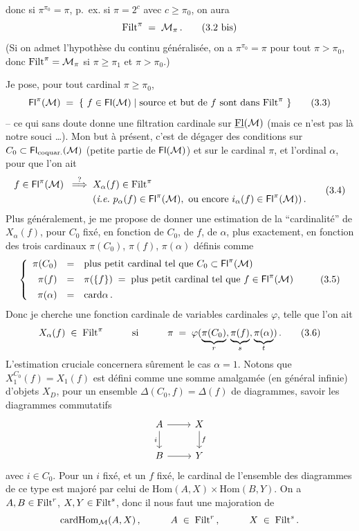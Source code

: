 donc si $\pi^{\pi_0}=\pi$, p.~ex. si $\pi=2^c$ avec $c\geq\pi_0$, on aura
\[
\Filt^\pi \;=\; \cM_\pi\,.
\tag*{(3.2 bis)}
\]
(Si on admet l'hypothèse du continu généralisée, on a $\pi^{\pi_0}=\pi$ pour tout $\pi>\pi_0$, donc $\mathrm{Filt}^\pi=\mathcal{M}_\pi$ si $\pi\geq\pi_1$ et $\pi>\pi_0$.)

Je pose, pour tout cardinal $\pi\geq\pi_0$,
\[
\Fl^\pi(\cM) \;=\; \{\ f\in\Fl(\cM) \mid \text{source et but de $f$ sont dans } \Filt^\pi\ \}
\tag*{(3.3)}
\]
-- ce qui sans doute donne une filtration cardinale sur $\underline{\mathrm{Fl}}(\mathcal{M})$ (mais ce n'est pas là notre souci \ldots). Mon but à présent, c'est de dégager des conditions sur $C_0\subset\mathsf{Fl}_{\text{coquar.}}(\mathcal{M})$ (petite partie de $\mathsf{Fl}(\mathcal{M})$) et sur le cardinal $\pi$, et l'ordinal $\alpha$, pour que l'on ait
\[
\begin{aligned}
f\in\Fl^\pi(\cM) \;\;\overset{?}{\Longrightarrow}\;\; & X_\alpha(f)\in\Filt^\pi \\
& (\textit{i.e.}\ p_\alpha(f)\in\Fl^\pi(\cM),\ \text{ou encore } i_\alpha(f)\in\Fl^\pi(\cM))\,.
\end{aligned}
\tag*{(3.4)}
\]
Plus généralement, je me propose de donner une estimation de la ``cardinalité'' de $X_\alpha(f)$, pour $C_0$ fixé, en fonction de $C_0$, de $f$, de $\alpha$, plus exactement, en fonction des trois cardinaux $\pi(C_0)$, $\pi(f)$, $\pi(\alpha)$ définis comme
\[
\left\{
\begin{array}{rcl}
\pi(C_0) & = & \text{plus petit cardinal tel que } C_0\subset\Fl^\pi(\cM) \\[1ex]
\pi(f) & = & \pi(\{f\}) \;=\; \text{plus petit cardinal tel que } f\in\Fl^\pi(\cM) \\[1ex]
\pi(\alpha) & = & \card\alpha\,.
\end{array}
\right.
\tag*{(3.5)}
\]
Donc je cherche une fonction
cardinale de variables cardinales $\varphi$, telle que l'on ait
\[
X_\alpha(f) \;\in\; \Filt^\pi \qquad\quad \text{si} \qquad\quad \pi \;=\; \varphi(\underbrace{\pi(C_0)}_{r},\underbrace{\pi(f)}_{s},\underbrace{\pi(\alpha)}_{t})\,.
\tag*{(3.6)}
\]
L'estimation cruciale concernera sûrement le cas $\alpha=1$. Notons que $X_1^{C_0}(f)=X_1(f)$ est défini comme une somme amalgamée (en général infinie) d'objets $X_D$, pour un ensemble $\Delta(C_0,f)=\Delta(f)$ de diagrammes, savoir les diagrammes commutatifs
\[
\begin{tikzcd}
A \arrow[r] \arrow[d, "i"'] & X \arrow[d, "f"] \\
B \arrow[r] & Y
\end{tikzcd}
\]
avec $i\in C_0$. Pour un $i$ fixé, et un $f$ fixé, le cardinal de l'ensemble des diagrammes de ce type est majoré par celui de $\mathrm{Hom}(A,X)\times\mathrm{Hom}(B,Y)$. On a $A,B\in\mathrm{Filt}^r$, $X,Y\in\mathrm{Filt}^s$, donc il nous faut une majoration de
\[
\mathrm{card}\mathrm{Hom}_{\mathcal{M}}(A,X)\,, \qquad\quad A\;\in\;\mathrm{Filt}^r\,, \qquad\quad X\;\in\;\mathrm{Filt}^s\,.
\]

